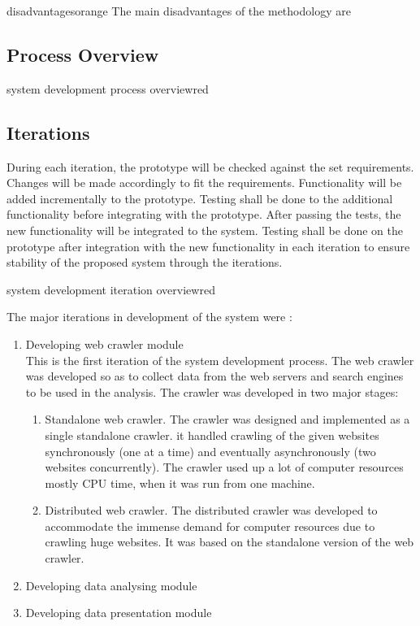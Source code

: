 \begin{review_comment}{disadvantages}{orange}
{The main disadvantages of the methodology are}
\end{review_comment}

\subsection{Process Overview}
\begin{review_comment}{system development process overview}{red}{}
\end{review_comment}

\subsection{Iterations}
During each iteration, the prototype will be checked against the set requirements. Changes will be made accordingly to fit the requirements.
Functionality will be added incrementally to the prototype. Testing shall be done to the additional functionality before integrating with the prototype. After passing the tests, the new functionality will
be integrated to the system.
Testing shall be done on the prototype after integration with the new functionality in each iteration to ensure stability of the proposed system through the iterations.

\begin{review_comment}{system development iteration overview}{red}{}
\end{review_comment}
The major iterations in development of the system were :
\begin{enumerate}
\item Developing web crawler module\\
This is the first iteration of the system development process. The web crawler was developed so as
to collect data from the web servers and search engines to be used in the analysis. The crawler was
developed in two major stages:
\begin{enumerate}
\item Standalone web crawler.
The crawler was designed and implemented as a single standalone crawler. it handled crawling of
the given websites synchronously (one at a time) and eventually asynchronously (two websites concurrently). The crawler used up a lot of computer resources mostly CPU time, when it was run from one machine.
\item Distributed web crawler. 
The distributed crawler was developed to accommodate the immense demand for computer resources due to crawling huge websites. It was based on the standalone version of the web crawler.
\end{enumerate}
\item Developing data analysing module\\
\item Developing data presentation module\\
\end{enumerate}

